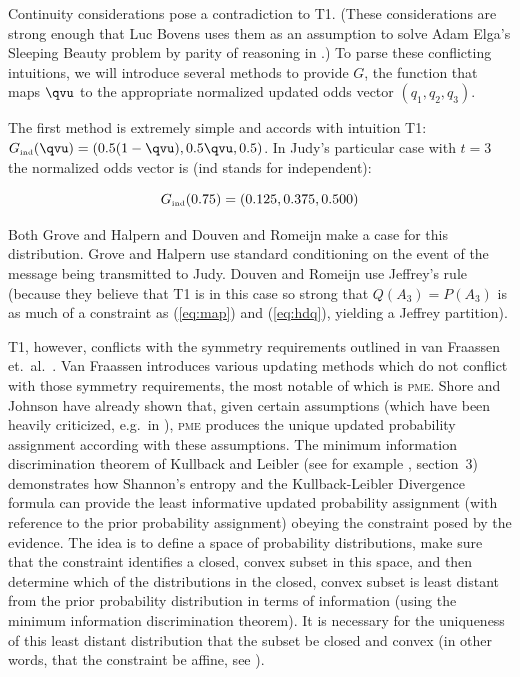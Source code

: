 \documentclass[phd,12pt,oneside]{ubcthesis}
\begin{document}
\nial Continuity considerations pose a contradiction to T1. (These
considerations are strong enough that Luc Bovens uses them as an
assumption to solve Adam Elga's Sleeping Beauty problem by parity of
reasoning in .) To parse these conflicting
intuitions, we will introduce several methods to provide $G$, the
function that maps ${\qvu}$ to the appropriate normalized updated odds
vector $(q_{1},q_{2},q_{3})$. 

The first method is extremely simple and accords with intuition T1:
$G_{\mbox{{\tiny ind}}}({\qvu})=(0.5(1-{\qvu}),0.5{\qvu},0.5)$. In
Judy's particular case with $t=3$ the normalized odds vector is (ind
stands for independent):

\begin{equation}
  \label{eq:shipodei}
  G_{\mbox{{\tiny ind}}}(0.75)=(0.125,0.375,0.500)
\end{equation}

\nial Both Grove and Halpern  and Douven
and Romeijn  make a case for this
distribution. Grove and Halpern use standard conditioning on the event
of the message being transmitted to Judy. Douven and Romeijn use
Jeffrey's rule (because they believe that T1 is in this case so strong
that $Q(A_{3})=P(A_{3})$ is as much of a constraint as (\ref{eq:map})
and (\ref{eq:hdq}), yielding a Jeffrey partition). 

T1, however, conflicts with the symmetry requirements outlined in van
Fraassen et.\ al.\ . Van Fraassen
introduces various updating methods which do not conflict with those
symmetry requirements, the most notable of which is \textsc{pme}.
Shore and Johnson have already shown that, given certain assumptions
(which have been heavily criticized, e.g.\ in ),
\textsc{pme} produces the unique updated probability assignment
according with these assumptions. The minimum information
discrimination theorem of Kullback and Leibler (see for example
, section~3) demonstrates how Shannon's entropy
and the Kullback-Leibler Divergence formula can provide the least
informative updated probability assignment (with reference to the
prior probability assignment) obeying the constraint posed by the
evidence. The idea is to define a space of probability distributions,
make sure that the constraint identifies a closed, convex subset in
this space, and then determine which of the distributions in the
closed, convex subset is least distant from the prior probability
distribution in terms of information (using the minimum information
discrimination theorem). It is necessary for the uniqueness of this
least distant distribution that the subset be closed and convex (in
other words, that the constraint be affine, see
).
\end{document}
